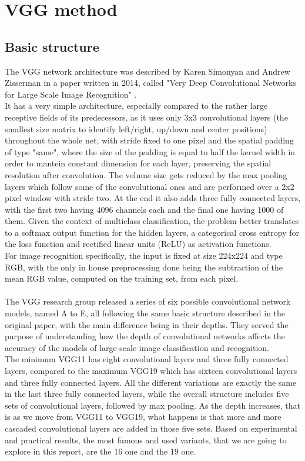 \documentclass[12pt,a4paper]{report}
\begin{document}
\chapter{VGG method}

\section{Basic structure}
The VGG network architecture was described by Karen Simonyan and Andrew Zisserman in a paper written in 2014, called "Very Deep Convolutional Networks for Large Scale Image Recognition" \cite{VGGpaper}. \\
It has a very simple architecture, especially compared to the rather large receptive fields of its predecessors, as it uses only 3x3 convolutional layers (the smallest size matrix to identify left/right, up/down and center positions) throughout the whole net, with stride fixed to one pixel and the spatial padding of type "same", where the size of the padding is equal to half the kernel width in order to mantein constant dimension for each layer, preserving the spatial resolution after convolution. The volume size gets reduced by the max pooling layers which follow some of the convolutional ones and are performed over a 2x2 pixel window with stride two. At the end it also adds three fully connected layers, with the first two having 4096 channels each and the final one having 1000 of them. Given the context of multiclass classification, the problem better translates to a softmax output function for the hidden layers, a categorical cross entropy for the loss function and rectified linear units (ReLU) as activation functions. \\
For image recognition specifically, the input is fixed at size 224x224 and type RGB, with the only in house preprocessing done being the subtraction of the mean RGB value, computed on the training set, from each pixel. \\ \\
The VGG research group released a series of six possible convolutional network models, named A to E, all following the same basic structure described in the original paper, with the main difference being in their depths. They served the purpose of understanding how the depth of convolutional networks affects the accuracy of the models of large-scale image classification and recognition. \\
The minimum VGG11 has eight convolutional layers and three fully connected layers, compared to the maximum VGG19 which has sixteen convolutional layers and three fully connected layers. All the different variations are exactly the same in the last three fully connected layers, while the overall structure includes five sets of convolutional layers, followed by max pooling. As the depth increases, that is as we move from VGG11 to VGG19, what happens is that more and more cascaded convolutional layers are added in those five sets. Based on experimental and practical results, the most famous and used variants, that we are going to explore in this report, are the 16 one and the 19 one. \\
\end{document}
